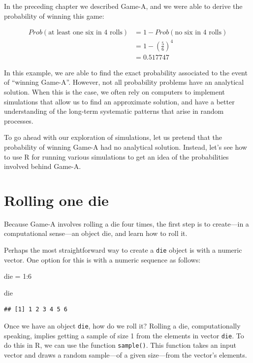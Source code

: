 \documentclass[
]{book}
\newenvironment{Shaded}{\begin{snugshade}}{\end{snugshade}}
\newcommand{\DecValTok}[1]{\textcolor[rgb]{0.00,0.00,0.81}{#1}}
\newcommand{\NormalTok}[1]{#1}
\newcommand{\OtherTok}[1]{\textcolor[rgb]{0.56,0.35,0.01}{#1}}
\newcommand{\SpecialCharTok}[1]{\textcolor[rgb]{0.00,0.00,0.00}{#1}}
\begin{document}
In the preceding chapter we described Game-A, and we were able to derive the
probability of winning this game:

\begin{align*}
Prob(\text{at least one six in 4 rolls}) &= 1 - Prob(\text{no six in 4 rolls}) \\
&= 1 - \left( \frac{5}{6} \right)^4 \\
&= 0.517747
\end{align*}

In this example, we are able to find the exact probability associated to the
event of ``winning Game-A''. However, not all probability problems have an
analytical solution. When this is the case, we often rely on computers to
implement simulations that allow us to find an approximate solution, and
have a better understanding of the long-term systematic patterns that arise
in random processes.

To go ahead with our exploration of simulations, let us pretend that the
probability of winning Game-A had no analytical solution. Instead, let's see
how to use R for running various simulations to get an idea of the probabilities
involved behind Game-A.

\hypertarget{rolling-one-die}{%
\section{Rolling one die}\label{rolling-one-die}}

Because Game-A involves rolling a die four times, the first step is to
create---in a computational sense---an object die, and learn how to roll it.

Perhaps the most straightforward way to create a \texttt{die} object is with a numeric
vector. One option for this is with a numeric sequence as follows:

\begin{Shaded}
\begin{Highlighting}[]
\NormalTok{die }\OtherTok{=} \DecValTok{1}\SpecialCharTok{:}\DecValTok{6}

\NormalTok{die}
\end{Highlighting}
\end{Shaded}

\begin{verbatim}
## [1] 1 2 3 4 5 6
\end{verbatim}

Once we have an object \texttt{die}, how do we roll it? Rolling a die, computationally
speaking, implies getting a sample of size 1 from the elements in vector \texttt{die}.
To do this in R, we can use the function \texttt{sample()}. This function takes an
input vector and draws a random sample---of a given size---from the vector's
elements.
\end{document}
